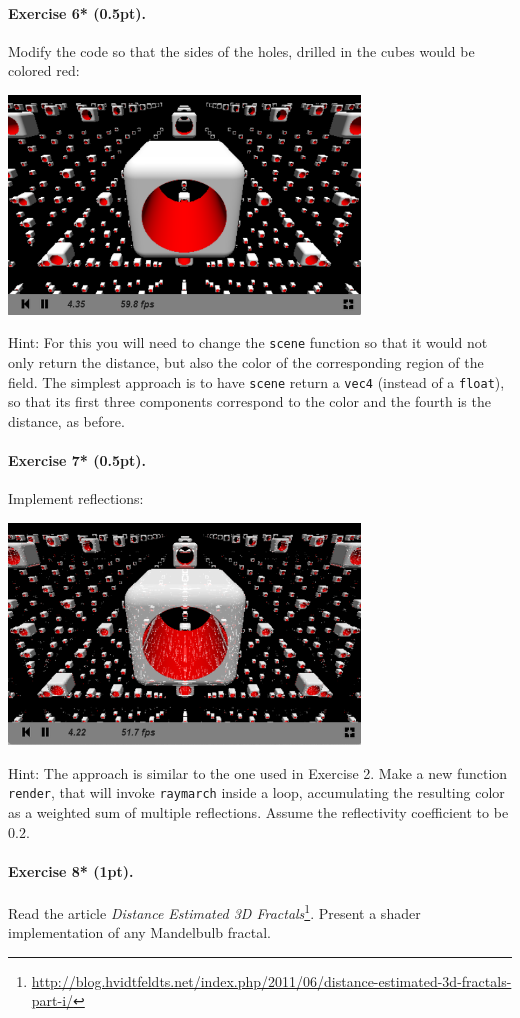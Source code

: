 \documentclass{article}
\newenvironment{exercise}[2]{\paragraph{Exercise #1 (#2pt).} }{
\medskip}
\begin{document}
\begin{exercise}{6*}{0.5}
Modify the code so that the sides of the holes, drilled in the cubes would be colored red:
\begin{center}
\includegraphics[width=0.7\textwidth]{raymarching3.png}
\end{center}
Hint: For this you will need to change the \texttt{scene} function so that it would not only return the distance, but also the color of the corresponding region of the field. The simplest approach is to have \texttt{scene} return a \texttt{vec4} (instead of a \texttt{float}), so that its first three components correspond to the color and the fourth is the distance, as before.
\end{exercise}

\begin{exercise}{7*}{0.5}
Implement reflections:
\begin{center}
\includegraphics[width=0.7\textwidth]{raymarching4.png}
\end{center}
Hint: The approach is similar to the one used in Exercise 2. Make a new function \texttt{render}, that will invoke \texttt{raymarch} inside a loop, accumulating the resulting color as a weighted sum of multiple reflections. Assume the reflectivity coefficient to be $0.2$.
\end{exercise}


\begin{exercise}{8*}{1}
Read the article \emph{Distance Estimated 3D Fractals}\footnote{\url{http://blog.hvidtfeldts.net/index.php/2011/06/distance-estimated-3d-fractals-part-i/}}. Present a shader implementation of any Mandelbulb fractal.
\end{exercise}
\end{document}
